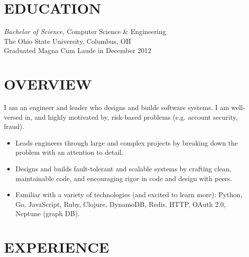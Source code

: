 \documentclass[line,letterpaper]{resume}
\begin{document}
\address{\href{https://www.ryanmcg.com}{Personal website --- https://www.ryanmcg.com}}
\address{\href{mailto:ryan@ryanmcg.com}{ryan@ryanmcg.com}}


\begin{resume}
    \vspace{-12pt}
    \section{\uppercase{Education}}

    \vspace{6pt}
    {\sl Bachelor of Science,} Computer Science \& Engineering \\
    The Ohio State University, Columbus, OH \\
    Graduated Magna Cum Laude in December 2012 \\

    \vspace{-10pt}

    \section{\uppercase{Overview}}
    \vspace{6pt}

    I am an engineer and leader who designs and builds software systems.
    I am well-versed in, and highly motivated by, risk-based problems (e.g. account security, fraud).
    \vspace{6pt}
    \begin{itemize}
        \item Leads engineers through large and complex projects by breaking
            down the problem with an attention to detail.
        \item Designs and builds fault-tolerant and scalable systems by crafting
            clean, maintainable code, and encouraging rigor in code and design
            with peers.
        \item Familiar with a variety of technologies (and excited to learn
            more): Python, Go, JavaScript, Ruby, Clojure, DynamoDB, Redis, HTTP,
            OAuth 2.0, Neptune (graph DB).
    \end{itemize}

    \vspace{6pt}

    \section{\uppercase{Experience}}
    \vspace{6pt}


\end{resume}
\end{document}
